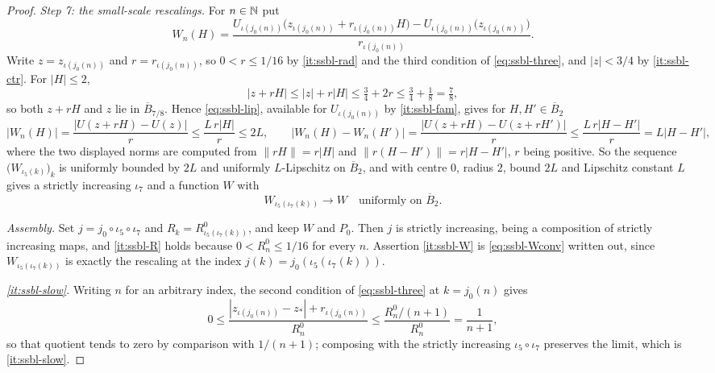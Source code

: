 \begin{proof}
\emph{Step 7: the small-scale rescalings.} For $n\in\mathbb{N}$ put
\[
  W_n(H)=\frac{U_{\iota(j_0(n))}\bigl(z_{\iota(j_0(n))}
    +r_{\iota(j_0(n))}H\bigr)-U_{\iota(j_0(n))}\bigl(z_{\iota(j_0(n))}\bigr)}
    {r_{\iota(j_0(n))}} .
\]
Write $z=z_{\iota(j_0(n))}$ and $r=r_{\iota(j_0(n))}$, so $0<r\le1/16$ by
\ref{it:ssbl-rad} and the third condition of \eqref{eq:ssbl-three}, and
$|z|<3/4$ by \ref{it:ssbl-ctr}. For $|H|\le2$,
\[
  |z+rH|\le|z|+r|H|\le\tfrac34+2r\le\tfrac34+\tfrac18=\tfrac78 ,
\]
so both $z+rH$ and $z$ lie in $\overline B_{7/8}$. Hence \eqref{eq:ssbl-lip},
available for $U_{\iota(j_0(n))}$ by \ref{it:ssbl-fam}, gives for
$H,H'\in\overline B_2$
\[
  |W_n(H)|=\frac{|U(z+rH)-U(z)|}{r}\le\frac{L\,r|H|}{r}\le2L,
  \qquad
  |W_n(H)-W_n(H')|=\frac{|U(z+rH)-U(z+rH')|}{r}\le\frac{L\,r|H-H'|}{r}
   =L|H-H'| ,
\]
where the two displayed norms are computed from
$\|rH\|=r|H|$ and $\|r(H-H')\|=r|H-H'|$, $r$ being positive. So the sequence
$\bigl(W_{\iota_5(k)}\bigr)_k$ is uniformly bounded by $2L$ and uniformly
$L$-Lipschitz on $\overline B_2$, and  with
centre $0$, radius $2$, bound $2L$ and Lipschitz constant $L$ gives a strictly
increasing $\iota_7$ and a function $W$ with
\begin{equation}\label{eq:ssbl-Wconv}
  W_{\iota_5(\iota_7(k))}\longrightarrow W
  \quad\text{uniformly on }\overline B_2 .
\end{equation}

\emph{Assembly.} Set $j=j_0\circ\iota_5\circ\iota_7$ and
$R_k=R^0_{\iota_5(\iota_7(k))}$, and keep $W$ and $P_0$. Then $j$ is strictly
increasing, being a composition of strictly increasing maps, and
\ref{it:ssbl-R} holds because $0<R^0_n\le1/16$ for every $n$. Assertion
\ref{it:ssbl-W} is \eqref{eq:ssbl-Wconv} written out, since
$W_{\iota_5(\iota_7(k))}$ is exactly the rescaling at the index
$j(k)=j_0(\iota_5(\iota_7(k)))$.

\emph{\ref{it:ssbl-slow}.} Writing $n$ for an arbitrary index, the second
condition of \eqref{eq:ssbl-three} at $k=j_0(n)$ gives
\[
  0\le\frac{|z_{\iota(j_0(n))}-z_*|+r_{\iota(j_0(n))}}{R^0_n}
   \le\frac{R^0_n/(n+1)}{R^0_n}=\frac1{n+1},
\]
so that quotient tends to zero by comparison with $1/(n+1)$; composing with the
strictly increasing $\iota_5\circ\iota_7$ preserves the limit, which is
\ref{it:ssbl-slow}.


\end{proof}
